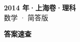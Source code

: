 \documentclass[zihao=-4, a4paper]{ctexart}
\begin{document}
\begin{center}
  {\Large\bfseries 2014 年·上海卷·理科}\\[4pt]
  {\large 数学 · 简答版}
\end{center}
\medskip
{}

\clearpage
{}
\begin{center}{\Large\bfseries 答案速查}\end{center}
\medskip

\end{document}
